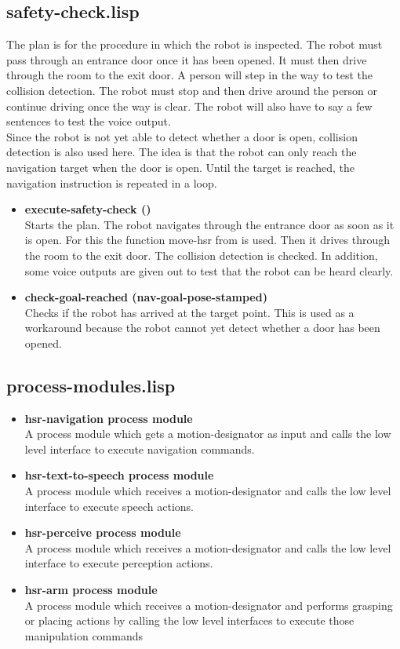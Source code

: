 \documentclass[main.tex]{subfiles}
\begin{document}
	    \subsection{safety-check.lisp}
	    The plan is for the procedure in which the robot is inspected. The robot must pass through an entrance door once it has been opened. It must then drive through the room to the exit door. A person will step in the way to test the collision detection.  The robot must stop and then drive around the person or continue driving once the way is clear. The robot will also have to say a few sentences to test the voice output. \\
			Since the robot is not yet able to detect whether a door is open, collision detection is also used here. The idea is that the robot can only reach the navigation target when the door is open. Until the target is reached, the navigation instruction is repeated in a loop.
	    \begin{itemize}
	    	\item \textbf{execute-safety-check ()} \\
	    	Starts the plan. The robot navigates through the entrance door as soon as it is open. For this the function move-hsr from  is used. Then it drives through the room to the exit door. The collision detection is checked. In addition, some voice outputs are given out to test that the robot can be heard clearly.
	    	\item \textbf{check-goal-reached (nav-goal-pose-stamped)}\\
	    	Checks if the robot has arrived at the target point. This is used as a workaround because the robot cannot yet detect whether a door has been opened.
	    \end{itemize}
	    \subsection{process-modules.lisp}
	     \begin{itemize}
		\label{pcm}
	    	\item \textbf{hsr-navigation process module} \\
		A process module which gets a motion-designator as input and calls the low level interface to execute navigation commands.
		\item \textbf{hsr-text-to-speech process module} \\
		A process module which receives a motion-designator and calls the low level interface to execute speech actions.
		\item \textbf{hsr-perceive process module} \\
		A process module which receives a motion-designator and calls the low level interface to execute perception actions.
		\item\textbf{hsr-arm process module} \\
		A process module which receives a motion-designator and performs grasping or placing actions by calling the low level interfaces to execute those manipulation commands 
	    \end{itemize}
\end{document}
